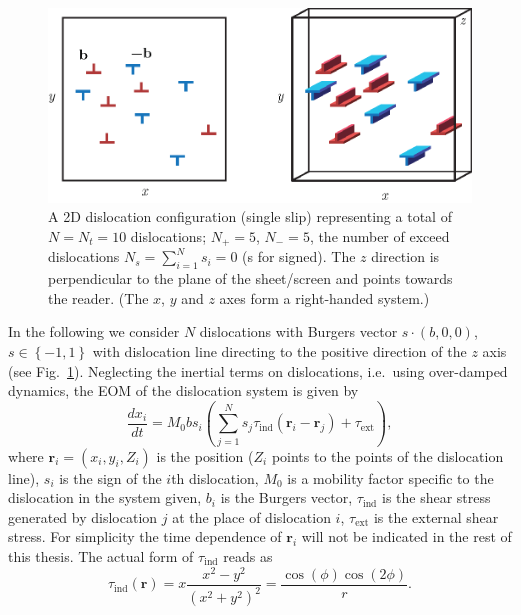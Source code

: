 \begin{figure}[htbp!] 
\centering    
\includegraphics{DDD2}
\caption[2D DDD]{A 2D dislocation configuration (single slip) representing a total of $N = N_t = 10$ dislocations; ${N_ + } = 5$, ${N_ - } = 5$, the number of exceed dislocations ${N_s} = \sum\limits_{i = 1}^N {{s_i}}  = 0$ (s for signed). The $z$ direction is perpendicular to the plane of the sheet/screen and points towards the reader. (The $x$, $y$ and $z$ axes form a right-handed system.)}
\label{fig:2D_DDD}
\end{figure}

In the following we consider $N$ dislocations with Burgers vector $s \cdot \left( {b,0,0} \right)$, $s \in \left\{ { - 1,1} \right\}$ with dislocation line directing to the positive direction of the $z$ axis (see Fig.~\ref{fig:2D_DDD}). Neglecting the inertial terms on dislocations, i.e.\ using over-damped dynamics, the EOM of the dislocation system is given by
\begin{equation} \label{eq:EOM_DDD}
\frac{{d{x_i}}}{{dt}} = {M_0}b{s_i}\left( {\sum\limits_{j = 1}^N {{s_j}{\tau _{{\text{ind}}}}\left( {{{\mathbf{r}}_i} - {{\mathbf{r}}_j}} \right) + {\tau _{{\text{ext}}}}} } \right),
\end{equation}
where ${{\mathbf{r}}_i} = \left( {{x_i},{y_i},{Z_i}} \right)$ is the position ($Z_i$ points to the points of the dislocation line), ${s_i}$ is the sign of the $i$th dislocation, $M_0$ is a mobility factor specific to the dislocation in the system given, $b_i$ is the Burgers vector, ${{\tau _{{\text{ind}}}}}$ is the shear stress generated by dislocation $j$ at the place of dislocation $i$, ${{\tau _{{\text{ext}}}}}$ is the external shear stress. For simplicity the time dependence of ${{\mathbf{r}}_i}$ will not be indicated in the rest of this thesis. The actual form of ${\tau _{{\text{ind}}}}$ reads as
\begin{equation} \label{eq:tau_ind}
{\tau _{{\text{ind}}}}\left( {\mathbf{r}} \right) = x\frac{{{x^2} - {y^2}}}{{{{\left( {{x^2} + {y^2}} \right)}^2}}} = \frac{{\cos \left( \phi  \right)\cos \left( {2\phi } \right)}}{r}.
\end{equation}

